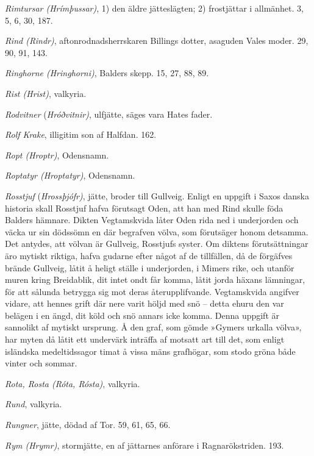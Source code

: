 \emph{Rimtursar (Hrímþussar)}, 1) den äldre jätteslägten; 2) frostjättar
i allmänhet. 3, 5, 6, 30, 187.

\emph{Rind (Rindr)}, aftonrodnadsherrskaren Billings dotter, asaguden
Vales moder. 29, 90, 91, 143.

\emph{Ringhorne (Hringhorni)}, Balders skepp. 15, 27, 88, 89.

\emph{Rist (Hrist)}, valkyria.

\emph{Rodvitner} (\emph{Hróðvitnir)}, ulfjätte, säges vara Hates fader.

\emph{Rolf Krake}, illigitim son af Halfdan. 162.

\emph{Ropt (Hroptr)}, Odensnamn.

\emph{Roptatyr (Hroptatyr)}, Odensnamn.

\emph{Rosstjuf} (\emph{Hrossþjófr)}, jätte, broder till Gullveig. Enligt
en uppgift i Saxos danska historia skall Rosstjuf hafva förutsagt Oden,
att han med Rind skulle föda Balders hämnare. Dikten Vegtamskvida låter
Oden rida ned i underjorden och väcka ur sin dödssömn en där begrafven
völva, som förutsäger honom detsamma. Det antydes, att völvan är
Gullveig, Rosstjufs syster. Om diktens förutsättningar äro mytiskt
riktiga, hafva gudarne efter något af de tillfällen, då de förgäfves
brände Gullveig, låtit å heligt ställe i underjorden, i Mimers rike, och
utanför muren kring Breidablik, dit intet ondt får komma, låtit jorda
häxans lämningar, för att sålunda betrygga sig mot deras
återupplifvande.
Vegtamskvida\protect\hypertarget{lb1625905.xhtmlux5cux23start236}{}{}\protect\hypertarget{lb1625905.xhtmlux5cux23start236-a}{}{}\protect\hypertarget{lb1625905.xhtmlux5cux23start236-b}{}{}\protect\hypertarget{lb1625905.xhtmlux5cux23start236-c}{}{}\protect\hypertarget{lb1625905.xhtmlux5cux23start236-d}{}{}
angifver vidare, att hennes grift där nere varit höljd med snö -- detta
ehuru den var belägen i en ängd, dit köld och snö annars icke komma.
Denna uppgift är sannolikt af mytiskt ursprung. Å den graf, som gömde
»Gymers urkalla völva», har myten då låtit ett undervärk inträffa af
motsatt art till det, som enligt isländska medeltidssagor timat å vissa
mäns grafhögar, som stodo gröna både vinter och sommar.

\emph{Rota, Rosta (Róta, Rósta)}, valkyria.

\emph{Rund}, valkyria.

\emph{Rungner}, jätte, dödad af Tor. 59, 61, 65, 66.

\emph{Rym (Hrymr)}, stormjätte, en af jättarnes anförare i
Ragnarökstriden. 193.

